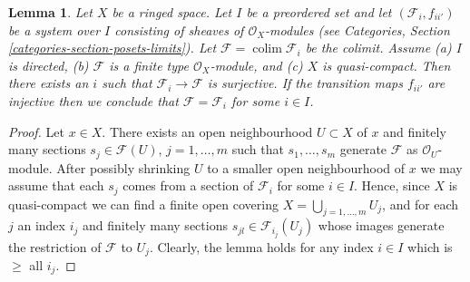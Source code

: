 \documentclass[10pt,a4paper]{amsart}
\theoremstyle{plain}
\newtheorem{lemma}[subsection]{Lemma}
\theoremstyle{definition}
\theoremstyle{remark}
\numberwithin{equation}{subsection}
\def\colim{\mathop{\mathrm{colim}}\nolimits}
\begin{document}
\begin{lemma}
\label{lemma-finite-type-quasi-compact-colimit}
Let $X$ be a ringed space. Let $I$ be a preordered set and
let $(\mathcal{F}_i, f_{ii'})$ be a system over $I$ consisting of sheaves
of $\mathcal{O}_X$-modules (see
Categories, Section \ref{categories-section-posets-limits}).
Let $\mathcal{F} = \colim \mathcal{F}_i$ be the colimit. Assume
(a) $I$ is directed,
(b) $\mathcal{F}$ is a finite type $\mathcal{O}_X$-module, and
(c) $X$ is quasi-compact. Then there exists an $i$ such that
$\mathcal{F}_i \to \mathcal{F}$ is surjective.
If the transition maps $f_{ii'}$ are injective
then we conclude that $\mathcal{F} = \mathcal{F}_i$ for some $i \in I$.
\end{lemma}

\begin{proof}
Let $x \in X$. There exists an open neighbourhood
$U \subset X$ of $x$ and finitely many sections
$s_j \in \mathcal{F}(U)$, $j = 1, \ldots, m$ such that
$s_1, \ldots, s_m$ generate $\mathcal{F}$ as $\mathcal{O}_U$-module.
After possibly shrinking $U$ to a smaller open neighbourhood of $x$
we may assume that each $s_j$ comes from a section of $\mathcal{F}_i$
for some $i \in I$.
Hence, since $X$ is quasi-compact we can find a finite open
covering $X = \bigcup_{j = 1, \ldots, m} U_j$, and for each $j$
an index $i_j$ and finitely many sections $s_{jl} \in \mathcal{F}_{i_j}(U_j)$
whose images generate the restriction of $\mathcal{F}$ to
$U_j$. Clearly, the lemma holds for any index $i \in I$ which
is $\geq$ all $i_j$.
\end{proof}
\end{document}
